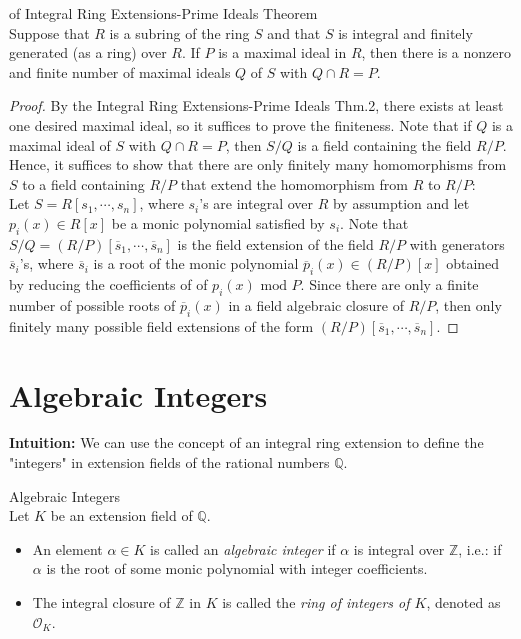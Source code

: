 \begin{corollary}{of Integral Ring Extensions-Prime Ideals Theorem}\\
Suppose that $R$ is a subring of the ring $S$ and that $S$ is integral and finitely generated (as a ring) over $R$. If $P$ is a maximal ideal in $R$, then there is a nonzero and finite number of maximal ideals $Q$ of $S$ with $Q \cap R=P$.
\end{corollary}

\begin{proof}
    By the Integral Ring Extensions-Prime Ideals Thm.2, there exists at least one desired maximal ideal, so it suffices to prove the finiteness. Note that if $Q$ is a maximal ideal of $S$ with $Q \cap R=P$, then $S/Q$ is a field containing the field $R/P$. Hence, it suffices to show that there are only finitely many homomorphisms from $S$ to a field containing $R/P$ that extend the homomorphism from $R$ to $R/P$:\\
    Let $S= R[s_1 ,\cdots, s_n]$, where $s_i$'s are integral over $R$ by assumption and let $p_i(x) \in R[x]$ be a monic polynomial satisfied by $s_i$. Note that $S/Q= (R/P) [ \overline{s}_1 ,\cdots, \overline{s}_n]$ is the field extension of the field $R/P$ with generators $\overline{s}_i$'s, where $\overline{s}_i$ is a root of the monic polynomial $\overline{p}_i(x) \in (R/P) [x]$ obtained by reducing the coefficients of of $p_i (x) \text{ mod }P$. Since there are only a finite number of possible roots of $\overline{p}_i (x)$ in a field algebraic closure of $R/P$, then only finitely many possible field extensions of the form $(R/P) [\overline{s}_1 ,\cdots, \overline{s}_n]$.
\end{proof}

\section{Algebraic Integers}

\noindent\textbf{Intuition:} We can use the concept of an integral ring extension to define the "integers" in extension fields of the rational numbers $\mathbb{Q}$.

\begin{definition}{Algebraic Integers}\\
Let $K$ be an extension field of $\mathbb{Q}$.
\begin{itemize}
    \item An element $\alpha \in K$ is called an \textit{algebraic integer} if $\alpha$ is integral over $\mathbb{Z}$, i.e.: if $\alpha$ is the root of some monic polynomial with integer coefficients.

    \item The integral closure of $\mathbb{Z}$ in $K$ is called the \textit{ring of integers of $K$}, denoted as $\mathcal{O}_K$.
\end{itemize}
\end{definition}


